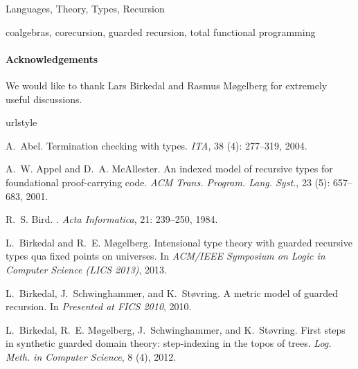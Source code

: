 \documentclass[natbib]{sigplanconf}
\begin{document}
\terms
  Languages, Theory, Types, Recursion

\keywords
  coalgebras, corecursion, guarded recursion, total functional programming







\paragraph{Acknowledgements} We would like to thank Lars Birkedal and
Rasmus M{\o}gelberg for extremely useful discussions.

\begin{thebibliography}{24}
\providecommand{\natexlab}[1]{#1}
\providecommand{\url}[1]{\texttt{#1}}
\expandafter\ifx\csname urlstyle\endcsname\relax
  \providecommand{\doi}[1]{doi: #1}\else
  \providecommand{\doi}{doi: \begingroup \urlstyle{rm}\Url}\fi

A.~Abel.
\newblock Termination checking with types.
\newblock \emph{ITA}, 38 (4): 277--319, 2004.

A.~W. Appel and D.~A. McAllester.
\newblock An indexed model of recursive types for foundational proof-carrying
  code.
\newblock \emph{ACM Trans. Program. Lang. Syst.}, 23 (5):
  657--683, 2001.

R.~S. Bird.
.
\newblock \emph{Acta Informatica}, 21: 239--250, 1984.

L.~Birkedal and R.~E. M{\o}gelberg.
\newblock Intensional type theory with guarded recursive types qua fixed points
  on universes.
\newblock In \emph{ACM/IEEE Symposium on Logic in Computer Science (LICS
  2013)}, 2013.

L.~Birkedal, J.~Schwinghammer, and K.~St{\o}vring.
\newblock A metric model of guarded recursion.
\newblock In \emph{Presented at FICS 2010}, 2010.

L.~Birkedal, R.~E. M{\o}gelberg, J.~Schwinghammer, and K.~St{\o}vring.
\newblock First steps in synthetic guarded domain theory: step-indexing in the
  topos of trees.
\newblock \emph{Log. Meth. in Computer Science}, 8 (4), 2012.


\end{thebibliography}
\end{document}
